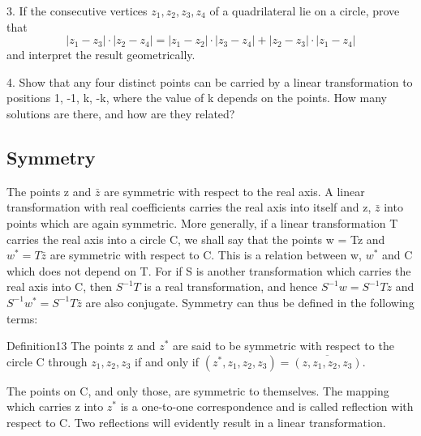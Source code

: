 3. If the consecutive vertices $z_{1}, z_{2}, z_{3}, z_{4}$ of a quadrilateral lie on a circle, prove that
\begin{equation*}
\left| z _ {1} - z _ {3} \right| \cdot \left| z _ {2} - z _ {4} \right| = \left| z _ {1} - z _ {2} \right| \cdot \left| z _ {3} - z _ {4} \right| + \left| z _ {2} - z _ {3} \right| \cdot \left| z _ {1} - z _ {4} \right|
\end{equation*}
and interpret the result geometrically.

4. Show that any four distinct points can be carried by a linear transformation to positions 1, -1, k, -k, where the value of k depends on the points. How many solutions are there, and how are they related?

\setcounter{section}{3}\setcounter{subsection}{2}\subsection{Symmetry}\label{sec:3.3.3}
The points z and $\bar{z}$ are symmetric with respect to the real axis. A linear transformation with real coefficients carries the real axis into itself and z, $\bar{z}$ into points which are again symmetric. More generally, if a linear transformation T carries the real axis into a circle C, we shall say that the points w = Tz and $w^{*} = T\bar{z}$ are symmetric with respect to C. This is a relation between w, $w^{*}$ and C which does not depend on T. For if S is another transformation which carries the real axis into C, then $S^{-1}T$ is a real transformation, and hence $S^{-1}w = S^{-1}Tz$ and $S^{-1}w^{*} = S^{-1}T\bar{z}$ are also conjugate. Symmetry can thus be defined in the following terms:

\begingroup\renewcommand{\thefootnote}{}\endgroup

\begin{originalstatement}{Definition}{13}\label{def:3.13}
The points z and $z^{*}$ are said to be symmetric with respect to the circle C through $z_{1}, z_{2}, z_{3}$ if and only if $(z^{*}, z_{1}, z_{2}, z_{3}) = \overline{(z, z_{1}, z_{2}, z_{3})}$.
\end{originalstatement}
The points on C, and only those, are symmetric to themselves. The mapping which carries z into $z^{*}$ is a one-to-one correspondence and is called reflection with respect to C. Two reflections will evidently result in a linear transformation.

